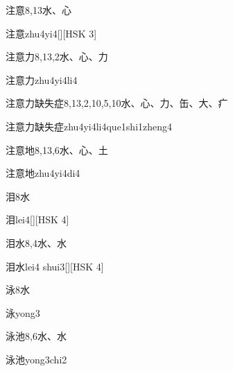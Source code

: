 \begin{Entry}{注意}{8,13}{⽔、⼼}
  \begin{Phonetics}{注意}{zhu4yi4}[][HSK 3]
  \end{Phonetics}
\end{Entry}

\begin{Entry}{注意力}{8,13,2}{⽔、⼼、⼒}
  \begin{Phonetics}{注意力}{zhu4yi4li4}
  \end{Phonetics}
\end{Entry}

\begin{Entry}{注意力缺失症}{8,13,2,10,5,10}{⽔、⼼、⼒、⽸、⼤、⽧}
  \begin{Phonetics}{注意力缺失症}{zhu4yi4li4que1shi1zheng4}
  \end{Phonetics}
\end{Entry}

\begin{Entry}{注意地}{8,13,6}{⽔、⼼、⼟}
  \begin{Phonetics}{注意地}{zhu4yi4di4}
  \end{Phonetics}
\end{Entry}

\begin{Entry}{泪}{8}{⽔}
  \begin{Phonetics}{泪}{lei4}[][HSK 4]
  \end{Phonetics}
\end{Entry}

\begin{Entry}{泪水}{8,4}{⽔、⽔}
  \begin{Phonetics}{泪水}{lei4 shui3}[][HSK 4]
  \end{Phonetics}
\end{Entry}

\begin{Entry}{泳}{8}{⽔}
  \begin{Phonetics}{泳}{yong3}
  \end{Phonetics}
\end{Entry}

\begin{Entry}{泳池}{8,6}{⽔、⽔}
  \begin{Phonetics}{泳池}{yong3chi2}
  \end{Phonetics}
\end{Entry}


